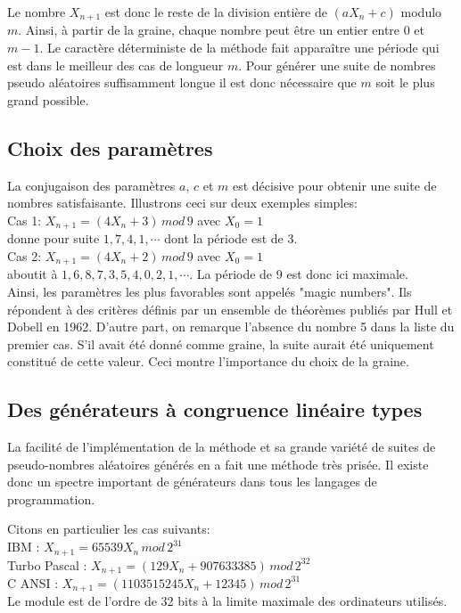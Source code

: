 \documentclass{scrartcl}
\begin{document}
Le nombre $X_{n+1}$ est donc le reste de la division entière de $(a X_n +c)$ modulo $m$. Ainsi, à partir de la graine, chaque nombre peut être un entier entre 0 et $m-1$.
Le caractère déterministe de la méthode fait apparaître une période qui est dans le meilleur des cas de longueur $m$.
Pour générer une suite de nombres pseudo aléatoires suffisamment longue il est donc nécessaire que $m$ soit le plus grand possible.

\subsection{Choix des paramètres}
La conjugaison des paramètres $a$, $c$ et $m$ est décisive pour obtenir une suite de nombres satisfaisante. Illustrons ceci sur deux exemples simples:\\

Cas 1: $X_{n+1} = (4 X_n + 3)\, mod\, 9$ avec $X_0 = 1$\\
donne pour suite $1,7,4,1, \cdots$ dont la période est de 3.\\
Cas 2: $X_{n+1} = (4 X_n +2)\, mod\, 9$ avec $X_0 = 1$\\ aboutit à $1,6,8,7,3,5,4,0,2,1, \cdots$. La période de 9 est donc ici maximale.\\

Ainsi, les paramètres les plus favorables sont appelés "magic numbers". Ils répondent à des critères définis par un ensemble de théorèmes publiés par Hull et Dobell en 1962.
D'autre part, on remarque l'absence du nombre 5 dans la liste du premier cas. S'il avait été donné comme graine, la suite aurait été uniquement constitué de cette valeur. Ceci montre l'importance du choix de la graine.

\subsection{Des générateurs à congruence linéaire types}

La facilité de l'implémentation de la méthode et sa grande variété de suites de pseudo-nombres aléatoires générés en a fait une méthode très prisée.
Il existe donc un spectre important de générateurs dans tous les langages de programmation.\par
Citons en particulier les cas suivants:\\
IBM : $X_{n+1} =65539 X_{n}\, mod\, 2^{31}$\\
Turbo Pascal : $X_{n+1} =(129 X_{n} + 907633385)\, mod\, 2^{32}$\\
C ANSI : $X_{n+1} =(1103515245 X_{n}+12345)\, mod\, 2^{31}$\\
Le module est de l'ordre de 32 bits à la limite maximale des ordinateurs utilisés.
\end{document}
